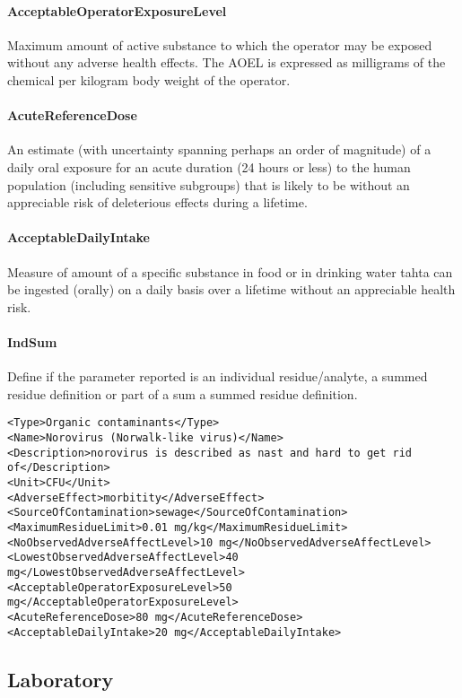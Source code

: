 \documentclass[a4paper]{report}
\begin{document}
\paragraph{AcceptableOperatorExposureLevel}
Maximum amount of active substance to which the operator may be exposed without any adverse health effects. The AOEL is expressed as milligrams of the chemical per kilogram body weight of the operator.

\paragraph{AcuteReferenceDose}
An estimate (with uncertainty spanning perhaps an order of magnitude) of a daily oral exposure for an acute duration (24 hours or less) to the human population (including sensitive subgroups) that is likely to be without an appreciable risk of deleterious effects during a lifetime.

\paragraph{AcceptableDailyIntake}
Measure of amount of a specific substance in food or in drinking water tahta can be ingested (orally) on a daily basis over a lifetime without an appreciable health risk.

\paragraph{IndSum}
Define if the parameter reported is an individual residue/analyte, a summed residue definition or part of a sum a summed residue definition.

\begin{lstlisting}[language=RAKIP, caption={Example of Hazard}]
<Type>Organic contaminants</Type>
<Name>Norovirus (Norwalk-like virus)</Name>
<Description>norovirus is described as nast and hard to get rid
of</Description>
<Unit>CFU</Unit>
<AdverseEffect>morbitity</AdverseEffect>
<SourceOfContamination>sewage</SourceOfContamination>
<MaximumResidueLimit>0.01 mg/kg</MaximumResidueLimit>
<NoObservedAdverseAffectLevel>10 mg</NoObservedAdverseAffectLevel>
<LowestObservedAdverseAffectLevel>40 mg</LowestObservedAdverseAffectLevel>
<AcceptableOperatorExposureLevel>50 mg</AcceptableOperatorExposureLevel>
<AcuteReferenceDose>80 mg</AcuteReferenceDose>
<AcceptableDailyIntake>20 mg</AcceptableDailyIntake>
\end{lstlisting}

\subsection{Laboratory}
\label{class:Laboratory}
\end{document}

